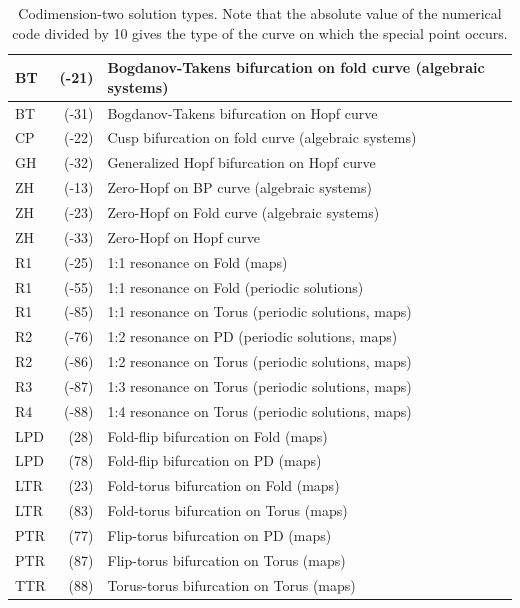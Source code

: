 \documentclass[12pt]{report}
\begin{document}
\begin{itemize}
\begin{table}[htbp]
\begin{center}
\begin{tabular}{| l | r | l |}
\hline
 BT & (-21) & Bogdanov-Takens bifurcation on fold curve (algebraic systems)\\
\hline
 BT & (-31) & Bogdanov-Takens bifurcation on Hopf curve \\
\hline
 CP & (-22) & Cusp bifurcation on fold curve (algebraic systems)\\
\hline
 GH & (-32) & Generalized Hopf bifurcation on Hopf curve \\
\hline
 ZH & (-13) & Zero-Hopf on BP curve (algebraic systems)\\
\hline
 ZH & (-23) & Zero-Hopf on Fold curve (algebraic systems)\\
\hline
 ZH & (-33) & Zero-Hopf on Hopf curve \\
\hline
 R1 & (-25) & 1:1 resonance on Fold (maps) \\
\hline
 R1 & (-55) & 1:1 resonance on Fold (periodic solutions) \\
\hline
 R1 & (-85) & 1:1 resonance on Torus (periodic solutions, maps) \\
\hline
 R2 & (-76) & 1:2 resonance on PD (periodic solutions, maps) \\
\hline
 R2 & (-86) & 1:2 resonance on Torus (periodic solutions, maps) \\
\hline
 R3 & (-87) & 1:3 resonance on Torus (periodic solutions, maps) \\
\hline
 R4 & (-88) & 1:4 resonance on Torus (periodic solutions, maps) \\
\hline
 LPD & (28) & Fold-flip bifurcation on Fold (maps) \\
\hline
 LPD & (78) & Fold-flip bifurcation on PD (maps) \\
\hline
 LTR & (23) & Fold-torus bifurcation on Fold (maps) \\
\hline
 LTR & (83) & Fold-torus bifurcation on Torus (maps) \\
\hline
 PTR & (77) & Flip-torus bifurcation on PD (maps) \\
\hline
 PTR & (87) & Flip-torus bifurcation on Torus (maps) \\
\hline
 TTR & (88) & Torus-torus bifurcation on Torus (maps) \\
\hline
\end{tabular}
\caption{Codimension-two solution types.
Note that the absolute value of the numerical code divided by 10
gives the type of the curve on which the special point occurs.}
\label{tbl:Codim2_Solution_Types}
\end{center}
\end{table}


\end{itemize}
\end{document}
